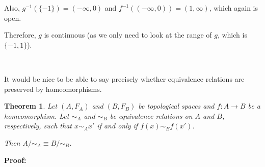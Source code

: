\documentclass[11pt]{amsart}
\newtheorem*{theorem}{Theorem}
\begin{document}
Also, $g^{-1}( \{-1 \} ) = (-\infty,0)$ and $f^{-1}((-\infty, 0)) = (1, \infty)$, which again is open.

Therefore, $g$ is continuous (as we only need to look at the range of $g$, which is $\{-1, 1\}$).

\mbox{ }

It would be nice to be able to say precisely whether equivalence relations are preserved by homeomorphisms.  
\begin{theorem}  Let $(A, F_A)$ and $(B, F_B)$ be topological spaces and $f:A\to B$ be a homeomorphism.  Let $\sim_A$ and $\sim_B$ be equivalence relations on $A$ and $B$, respectively, such that $x\sim_A x'$ if and only if $f(x) \sim_B f(x')$.

Then $A/\sim_A \equiv B/\sim_B$.
\end{theorem}
{\bf Proof: }
\end{document}
